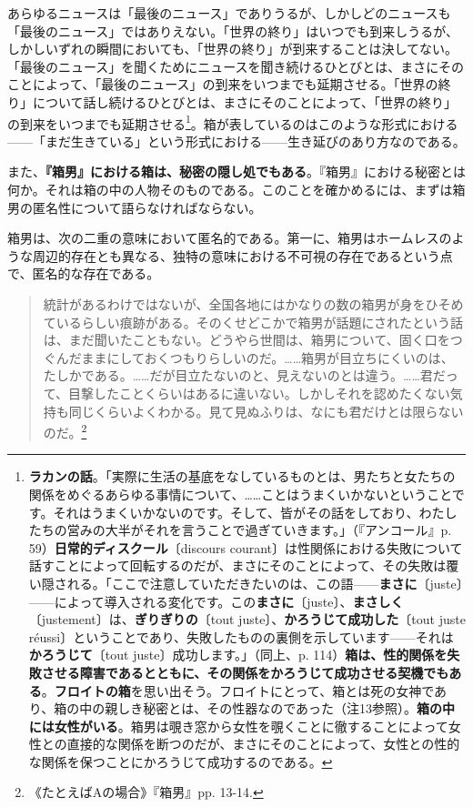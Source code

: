 \documentclass[a4paper]{jsarticle}
\begin{document}
あらゆるニュースは「最後のニュース」でありうるが、しかしどのニュースも「最後のニュース」ではありえない。「世界の終り」はいつでも到来しうるが、しかしいずれの瞬間においても、「世界の終り」が到来することは決してない。「最後のニュース」を聞くためにニュースを聞き続けるひとびとは、まさにそのことによって、「最後のニュース」の到来をいつまでも延期させる。「世界の終り」について話し続けるひとびとは、まさにそのことによって、「世界の終り」の到来をいつまでも延期させる\footnote{\textbf{ラカンの話}。「実際に生活の基底をなしているものとは、男たちと女たちの関係をめぐるあらゆる事情について、……ことはうまくいかないということです。それはうまくいかないのです。そして、皆がその話をしており、わたしたちの営みの大半がそれを言うことで過ぎていきます。」（『アンコール』p. 59）\textbf{日常的ディスクール}〔discours courant〕は性関係における失敗について話すことによって回転するのだが、まさにそのことによって、その失敗は覆い隠される。「ここで注意していただきたいのは、この語------\textbf{まさに}〔juste〕------によって導入される変化です。この\textbf{まさに}〔juste〕、\textbf{まさしく}〔justement〕は、\textbf{ぎりぎりの}〔tout juste〕、\textbf{かろうじて成功した}〔tout juste r\'eussi〕ということであり、失敗したものの裏側を示しています------それは\textbf{かろうじて}〔tout juste〕成功します。」（同上、p. 114）\textbf{箱は、性的関係を失敗させる障害であるとともに、その関係をかろうじて成功させる契機でもある}。\textbf{フロイトの箱}を思い出そう。フロイトにとって、箱とは死の女神であり、箱の中の親しき秘密とは、その性器なのであった（注13参照）。\textbf{箱の中には女性がいる}。箱男は覗き窓から女性を覗くことに徹することによって女性との直接的な関係を断つのだが、まさにそのことによって、女性との性的な関係を保つことにかろうじて成功するのである。}。箱が表しているのはこのような形式における------「まだ生きている」という形式における------生き延びのあり方なのである。

また、\textbf{『箱男』における箱は、秘密の隠し処でもある}。『箱男』における秘密とは何か。それは箱の中の人物そのものである。このことを確かめるには、まずは箱男の匿名性について語らなければならない。

箱男は、次の二重の意味において匿名的である。第一に、箱男はホームレスのような周辺的存在とも異なる、独特の意味における不可視の存在であるという点で、匿名的な存在である。

\begin{quotation}
統計があるわけではないが、全国各地にはかなりの数の箱男が身をひそめているらしい痕跡がある。そのくせどこかで箱男が話題にされたという話は、まだ聞いたこともない。どうやら世間は、箱男について、固く口をつぐんだままにしておくつもりらしいのだ。……箱男が目立ちにくいのは、たしかである。……だが目立たないのと、見えないのとは違う。……君だって、目撃したことくらいはあるに違いない。しかしそれを認めたくない気持も同じくらいよくわかる。見て見ぬふりは、なにも君だけとは限らないのだ。\footnote{《たとえばAの場合》『箱男』pp. 13-14.}
\end{quotation}
\end{document}
